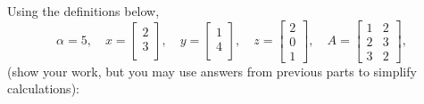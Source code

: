 \documentclass{article}
\begin{document}
\noindent Using the definitions below,
\[
\alpha = 5,\quad
x = \left[\begin{array}{c}
2\\
3\\
\end{array}\right], \quad 
y = \left[\begin{array}{c}
1\\
4\\
\end{array}\right],\quad
z = \left[\begin{array}{c}
2\\
0\\
1\end{array}\right],
\quad
A = \left[\begin{array}{ccc}
1 & 2\\
2 & 3\\
3 & 2
\end{array}\right],
\]
 (show your work, but you may use answers from previous parts to simplify calculations):\\
\end{document}
